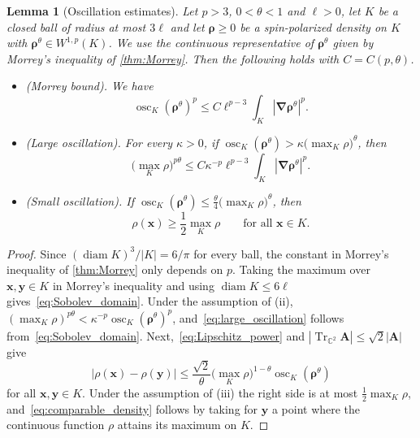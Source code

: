 \documentclass[final,reqno]{amsart}
\newtheorem{lemma}[theorem]{Lemma}
\theoremstyle{remark}
\renewcommand{\le}{\leqslant}
\renewcommand{\ge}{\geqslant}
\DeclareMathOperator{\diam}{diam}
\DeclareMathOperator{\Tr}{Tr}
\newcommand{\Trs}{\Tr_{\CC^2}}
\newcommand{\CC}{\mathbb{C}}
\newcommand{\grad}{\bm{\nabla}}
\begin{document}
\begin{lemma}[Oscillation estimates]\label{lem:oscillation}
Let $p>3$, $0<\theta<1$ and $\ell>0$, let $K$ be a closed ball of radius at most $3\ell$ and let $\bm{\rho}\ge0$ be a spin-polarized density on $K$ with $\bm{\rho}^\theta\in W^{1,p}(K)$. We use the continuous representative of $\bm{\rho}^\theta$ given by Morrey's inequality of \cref{thm:Morrey}. Then the following holds with $C=C(p,\theta)$.
\begin{itemize}
\item[(i)] \emph{(Morrey bound)}. We have
\begin{equation}\label{eq:Sobolev_domain}
\operatorname{osc}_K(\bm{\rho}^\theta)^p\le C\ell^{p-3}\int_K|\grad\bm{\rho}^\theta|^p .
\end{equation}
\item[(ii)] \emph{(Large oscillation)}. For every $\kappa>0$, if $\operatorname{osc}_K(\bm{\rho}^\theta)>\kappa\big(\max_K\rho\big)^\theta$, then
\begin{equation}\label{eq:large_oscillation}
\big(\max_K\rho\big)^{p\theta}\le C\kappa^{-p}\ell^{p-3}\int_K|\grad\bm{\rho}^\theta|^p .
\end{equation}
\item[(iii)] \emph{(Small oscillation)}. If $\operatorname{osc}_K(\bm{\rho}^\theta)\le\frac\theta4\big(\max_K\rho\big)^\theta$, then
\begin{equation}\label{eq:comparable_density}
\rho(\mathbf{x})\ge\frac12\max_K\rho\qquad\text{for all $\mathbf{x}\in K$.}
\end{equation}
\end{itemize}
\end{lemma}

\begin{proof}
Since $(\diam K)^3/|K|=6/\pi$ for every ball, the constant in Morrey's inequality of \cref{thm:Morrey} only depends on $p$. Taking the maximum over $\mathbf{x},\mathbf{y}\in K$ in Morrey's inequality and using $\diam K\le6\ell$ gives~\cref{eq:Sobolev_domain}. Under the assumption of (ii), $(\max_K\rho)^{p\theta}<\kappa^{-p}\operatorname{osc}_K(\bm{\rho}^\theta)^p$, and~\cref{eq:large_oscillation} follows from~\cref{eq:Sobolev_domain}. Next,~\cref{eq:Lipschitz_power} and $|\Trs\mathbf{A}|\le\sqrt2|\mathbf{A}|$ give
$$
\big|\rho(\mathbf{x})-\rho(\mathbf{y})\big|\le\frac{\sqrt2}{\theta}\Big(\max_K\rho\Big)^{1-\theta}\operatorname{osc}_K(\bm{\rho}^\theta)
$$
for all $\mathbf{x},\mathbf{y}\in K$. Under the assumption of (iii) the right side is at most $\frac12\max_K\rho$, and~\cref{eq:comparable_density} follows by taking for $\mathbf{y}$ a point where the continuous function $\rho$ attains its maximum on $K$.
\end{proof}
\end{document}

